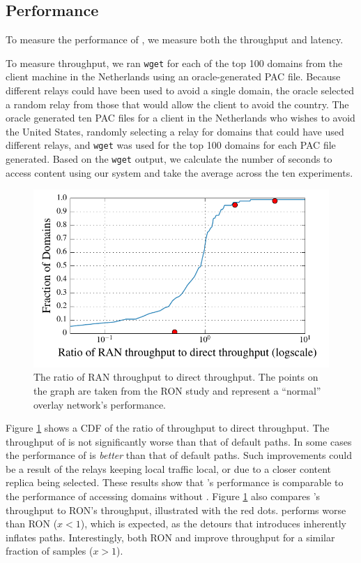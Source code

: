 \subsection{Performance}
To measure the performance of \system{}, we measure both 
the throughput and latency.

To measure throughput, we ran {\tt wget} for each 
of the top 100 domains from the client machine in the Netherlands 
using an oracle-generated PAC file.  Because different relays could have been 
used to avoid a single domain, the oracle selected a random relay from those 
that would allow the client to avoid the country.  The oracle generated 
ten PAC files for a client in the Netherlands who wishes to avoid the United States,
 randomly selecting a relay for domains that could have used 
different relays, and {\tt wget} was used for the top 100 domains for each 
PAC file generated.  Based on the {\tt wget} output, we calculate the number 
of seconds to access content using our system and take the average across the 
ten experiments. 

\begin{figure}[t]
\centering
\includegraphics[width=.5\textwidth]{throughput}
\caption{The ratio of RAN throughput to direct throughput.  
The points on the graph are taken from the RON study and represent a ``normal'' overlay network's 
performance.} 
\label{fig:throughput}
\end{figure}

Figure \ref{fig:throughput} shows a CDF of the ratio of \system{}
throughput to direct throughput.  The throughput of
\system{} is not significantly worse than that of default paths.  
In some cases the performance of \system{} is {\it better} than
that of default paths.  Such improvements could be a result of the
relays keeping local traffic local, or due to a closer content replica
being selected.  These results show that \system{}'s performance is
comparable to the performance of accessing domains without \system{}.
Figure \ref{fig:throughput} also compares \system{}'s throughput to
RON's throughput, illustrated with the red dots.  \system{} performs
worse than RON ($x < 1$), which is expected, as the detours that
\system{} introduces inherently inflates paths.  Interestingly, both
RON and \system{} improve throughput for a similar fraction of samples
($x>1$).

